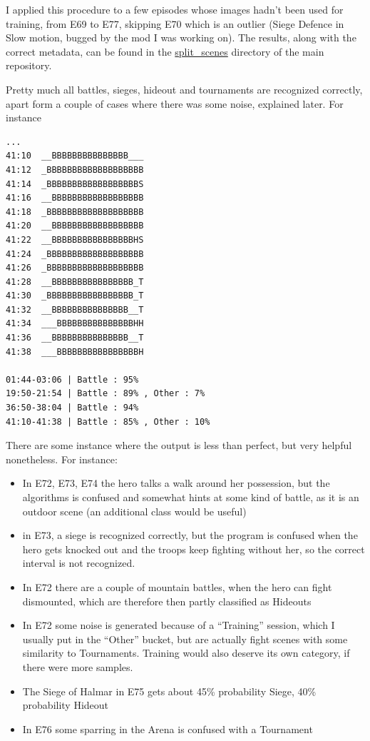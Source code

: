 \documentclass[
]{article}
\providecommand{\tightlist}{%
  \setlength{\itemsep}{0pt}\setlength{\parskip}{0pt}}
\begin{document}
I applied this procedure to a few episodes whose images hadn't been used
for training, from E69 to E77, skipping E70 which is an outlier (Siege
Defence in Slow motion, bugged by the mod I was working on). The
results, along with the correct metadata, can be found in the
\url{split_scenes} directory of the main repository.

Pretty much all battles, sieges, hideout and tournaments are recognized
correctly, apart form a couple of cases where there was some noise,
explained later. For instance

\begin{verbatim}
...
41:10  __BBBBBBBBBBBBBBB___
41:12  _BBBBBBBBBBBBBBBBBBB
41:14  _BBBBBBBBBBBBBBBBBBS
41:16  __BBBBBBBBBBBBBBBBBB
41:18  _BBBBBBBBBBBBBBBBBBB
41:20  __BBBBBBBBBBBBBBBBBB
41:22  __BBBBBBBBBBBBBBBBHS
41:24  _BBBBBBBBBBBBBBBBBBB
41:26  _BBBBBBBBBBBBBBBBBBB
41:28  __BBBBBBBBBBBBBBBB_T
41:30  _BBBBBBBBBBBBBBBBB_T
41:32  __BBBBBBBBBBBBBBB__T
41:34  ___BBBBBBBBBBBBBBBHH
41:36  __BBBBBBBBBBBBBBB__T
41:38  ___BBBBBBBBBBBBBBBBH

01:44-03:06 | Battle : 95%
19:50-21:54 | Battle : 89% , Other : 7%
36:50-38:04 | Battle : 94%
41:10-41:38 | Battle : 85% , Other : 10% 
\end{verbatim}

There are some instance where the output is less than perfect, but very
helpful nonetheless. For instance:


\begin{itemize}
	\tightlist
	\item 
	In E72, E73, E74  the hero talks a walk around her possession, but the algorithms is confused and somewhat hints at some kind of battle, as it is an outdoor scene (an additional class would be useful)
	\item
	in E73, a siege is recognized correctly, but the program is confused
	when the hero gets knocked out and the troops keep fighting without
	her, so the correct interval is not recognized.
	\item
	In E72 there are a couple of mountain battles, when the hero can fight
	dismounted, which are therefore then partly classified as Hideouts
	\item
	In E72 some noise is generated because of a ``Training'' session,
	which I usually put in the ``Other'' bucket, but are actually fight
	scenes with some similarity to Tournaments. Training would also
	deserve its own category, if there were more samples.
	\item
	The Siege of Halmar in E75 gets about 45\% probability Siege, 40\%
	probability Hideout
	\item
	In E76 some sparring in the Arena is confused with a Tournament
\end{itemize}
\end{document}
